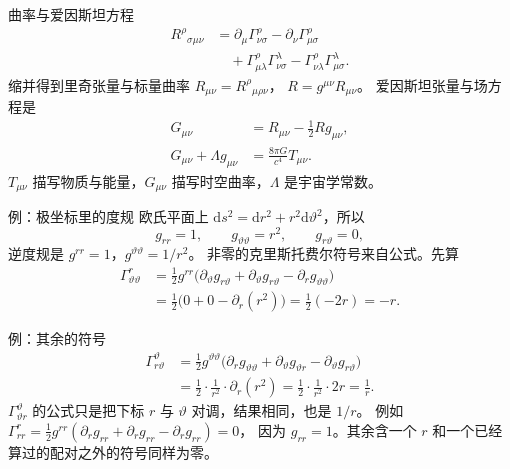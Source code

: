 \documentclass[fontset=windows, chinese, 10pt, xcolor=dvipsnames]{beamer}
\begin{document}
\begin{frame}{曲率与爱因斯坦方程}
  \small
  \begin{align*}
    R^\rho{}_{\sigma\mu\nu}
    &= \partial_\mu\Gamma^\rho_{\nu\sigma}
     - \partial_\nu\Gamma^\rho_{\mu\sigma} \\
    &\quad
     + \Gamma^\rho_{\mu\lambda}\Gamma^\lambda_{\nu\sigma}
     - \Gamma^\rho_{\nu\lambda}\Gamma^\lambda_{\mu\sigma}.
  \end{align*}
  缩并得到里奇张量与标量曲率
  $R_{\mu\nu}=R^\rho{}_{\mu\rho\nu}$，
  $R=g^{\mu\nu}R_{\mu\nu}$。
  爱因斯坦张量与场方程是
  \begin{align*}
    G_{\mu\nu}
    &= R_{\mu\nu}-\frac12 R g_{\mu\nu},\\
    G_{\mu\nu}+\Lambda g_{\mu\nu}
    &= \frac{8\pi G}{c^4}T_{\mu\nu}.
  \end{align*}
  \normalsize
  $T_{\mu\nu}$ 描写物质与能量，$G_{\mu\nu}$ 描写时空曲率，$\Lambda$ 是宇宙学常数。
\end{frame}

\begin{frame}{例：极坐标里的度规}
  欧氏平面上 $\mathrm{d}s^2=\mathrm{d}r^2+r^2\mathrm{d}\vartheta^2$，所以
  \begin{equation*}
    g_{rr}=1,\qquad g_{\vartheta\vartheta}=r^2,\qquad g_{r\vartheta}=0,
  \end{equation*}
  逆度规是 $g^{rr}=1$，$g^{\vartheta\vartheta}=1/r^2$。
  非零的克里斯托费尔符号来自公式。先算
  \begin{align*}
    \Gamma^r_{\vartheta\vartheta}
    &= \frac12 g^{rr}
      \bigl(
        \partial_\vartheta g_{r\vartheta}
        +\partial_\vartheta g_{r\vartheta}
        -\partial_r g_{\vartheta\vartheta}
      \bigr) \\
    &= \frac12\bigl(0+0-\partial_r(r^2)\bigr)
     = \frac12(-2r)
     = -r.
  \end{align*}
\end{frame}

\begin{frame}{例：其余的符号}
  \begin{align*}
    \Gamma^\vartheta_{r\vartheta}
    &= \frac12 g^{\vartheta\vartheta}
      \bigl(
        \partial_r g_{\vartheta\vartheta}
        +\partial_\vartheta g_{\vartheta r}
        -\partial_\vartheta g_{r\vartheta}
      \bigr) \\
    &= \frac12\cdot\frac{1}{r^2}\cdot\partial_r(r^2)
     = \frac12\cdot\frac{1}{r^2}\cdot 2r
     = \frac1r.
  \end{align*}
  $\Gamma^\vartheta_{\vartheta r}$ 的公式只是把下标 $r$ 与 $\vartheta$ 对调，结果相同，也是 $1/r$。
  \vspace{0.3em}
  例如 $\Gamma^r_{rr}=\frac12 g^{rr}(\partial_r g_{rr}+\partial_r g_{rr}-\partial_r g_{rr})=0$，
  因为 $g_{rr}=1$。其余含一个 $r$ 和一个已经算过的配对之外的符号同样为零。
\end{frame}
\end{document}
